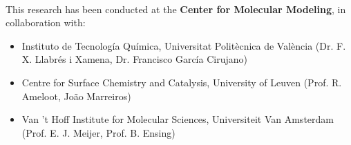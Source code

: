 \documentclass[10pt,twoside]{book}
\begin{document}

\newpage\null\thispagestyle{empty}\newpage
\thispagestyle{empty}
\noindent
\\
\vfill
{\small
\noindent \textsf{This research has been conducted at the \textbf{Center for
Molecular Modeling},} \noindent \textsf{in collaboration with:} \\
\begin{itemize}
\item 
Instituto de Tecnolog\'{i}a Qu\'{i}mica, Universitat Polit\`ecnica de Val\`encia
(Dr. F. X. Llabr\'es i Xamena, Dr. Francisco Garc\'{i}a Cirujano)
\item
Centre for Surface Chemistry and Catalysis, University of Leuven (Prof. R. Ameloot, Jo\~ao Marreiros)
\item
Van 't Hoff Institute for Molecular Sciences, Universiteit Van Amsterdam (Prof. E. J. Meijer, Prof. B. Ensing)
\end{itemize}
}

\newpage %
\thispagestyle{empty}

\renewcommand{\baselinestretch}{1.2}


\frontmatter
{}

\newpage\null\thispagestyle{empty}\newpage
\thispagestyle{empty}

\tableofcontents

    \glsaddall
    





\listoffigures
\clearpage{\pagestyle{empty}\cleardoublepage}
\end{document}
